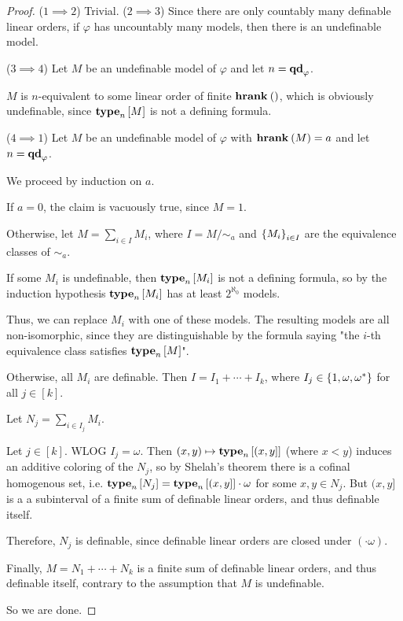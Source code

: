 \begin{proof}
    ($1 \implies 2$) Trivial.
    ($2 \implies 3$) Since there are only countably many
    definable linear orders, if $\varphi$ has uncountably many models,
    then there is an undefinable model.

    ($3 \implies 4$)
    Let $M$ be an undefinable model of $\varphi$
    and let $n = \mathbf{qd}_{\varphi}$.

    $M$ is $n$-equivalent to some linear order of finite $\mathbf{hrank}_{} \left( {} \right)$,
    which is obviously undefinable, since $\mathbf{type}_{n} \left[ {M} \right]$ is not
    a defining formula.

    ($4 \implies 1$)
    Let $M$ be an undefinable model of $\varphi$
    with $\mathbf{hrank}_{} \left( {M} \right) = a$
    and let $n = \mathbf{qd}_{\varphi}$.

    We proceed by induction on $a$.

    If $a = 0$, the claim is vacuously true, since $M = 1$.

    Otherwise, let $M = \sum_{i \in I} M_i$,
    where $I = M / \sim_{a}$ and $\left\{ {M_i} \right\}_{i \in I}$
    are the equivalence classes of $\sim_{a}$.

    If some $M_i$ is undefinable, then $\mathbf{type}_{n} \left[ {M_i} \right]$
    is not a defining formula, so by the induction
    hypothesis $\mathbf{type}_{n} \left[ {M_i} \right]$ has at least
    $2^{\aleph_0}$ models.

    Thus, we can replace $M_i$ with one of these models.
    The resulting models are all non-isomorphic,
    since they are distinguishable by the formula saying
    "the $i$-th equivalence class satisfies $\mathbf{type}_{n} \left[ {M} \right]$".

    Otherwise, all $M_i$ are definable. Then $I = I_1 + \cdots + I_k$,
    where $I_j \in \left\{ {1, \omega, \omega^\ast} \right\}$ for all $j \in [k]$.

    Let $N_j = \sum_{i \in I_j} M_i$.

    Let $j \in [k]$. WLOG $I_j = \omega$.
    Then $(x, y) \mapsto \mathbf{type}_{n} \left[ {(x, y]} \right]$ (where $x < y$) induces an additive coloring of
    the $N_j$, so by Shelah's theorem
    there is a cofinal homogenous set,
    i.e. $\mathbf{type}_{n} \left[ {N_j} \right] = \mathbf{type}_{n} \left[ {(x, y]} \right] \cdot \omega$ for some
    $x, y \in N_j$. But $(x, y]$ is a a subinterval
    of a finite sum of definable linear orders,
    and thus definable itself.

    Therefore, $N_j$ is definable, since
    definable linear orders are closed under $(\cdot \omega)$.

    Finally, $M = N_1 + \cdots + N_k$ is a finite sum of definable linear orders,
    and thus definable itself, contrary to the assumption that $M$ is undefinable.

    So we are done.
\end{proof}